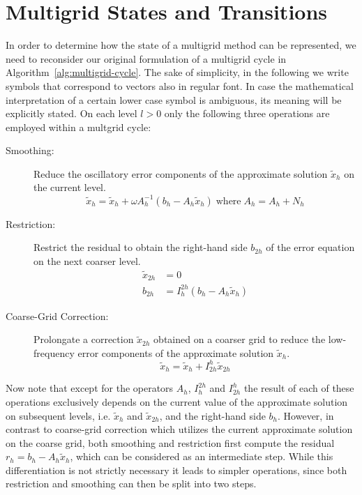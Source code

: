 \section{Multigrid States and Transitions}
In order to determine how the state of a multigrid method can be represented, we need to reconsider our original formulation of a multigrid cycle in Algorithm~\ref{alg:multigrid-cycle}.
The sake of simplicity, in the following we write symbols that correspond to vectors also in regular font.
In case the mathematical interpretation of a certain lower case symbol is ambiguous, its meaning will be explicitly stated. 
On each level $l > 0$ only the following three operations are employed within a multgrid cycle:
\begin{description}
	\item[Smoothing:] Reduce the oscillatory error components of the approximate solution $\tilde{x}_h$ on the current level. 
	\begin{equation*}
		\tilde{x}_h = \tilde{x}_h + \omega A_h^{-1} \left( b_h - A_h \tilde{x}_h \right) \; \text{where} \; A_h = A_h + N_h
	\end{equation*}
	\item[Restriction:] Restrict the residual to obtain the right-hand side $b_{2h}$ of the error equation on the next coarser level.
	\begin{align*}
		\tilde{x}_{2h} & = 0 \\
 		b_{2h} & = I_h^{2h} (b_h - A_h \tilde{x}_h)
	\end{align*}
	\item[Coarse-Grid Correction:] Prolongate a correction $\tilde{x}_{2h}$ obtained on a coarser grid to reduce the low-frequency error components of the approximate solution $\tilde{x}_h$.
	\begin{equation*}
		\tilde{x}_h = \tilde{x}_h + I_{2h}^h \tilde{x}_{2h}
	\end{equation*}
\end{description}
Now note that except for the operators $A_h$, $I_h^{2h}$ and $I_{2h}^h$ the result of each of these operations exclusively depends on the current value of the approximate solution on subsequent levels, i.e. $\tilde{x}_{h}$ and $\tilde{x}_{2h}$, and the right-hand side $b_h$.
However, in contrast to coarse-grid correction which utilizes the current approximate solution on the coarse grid, both smoothing and restriction first compute the residual $r_h = b_h - A_h \tilde{x}_h$, which can be considered as an intermediate step.
While this differentiation is not strictly necessary it leads to simpler operations, since both restriction and smoothing can then be split into two steps.

